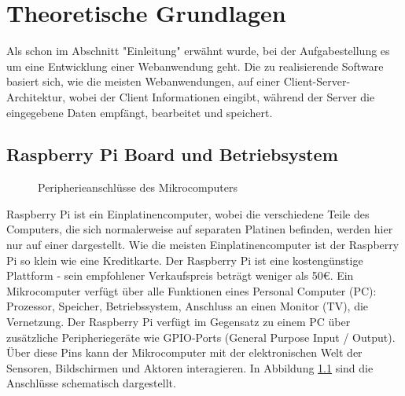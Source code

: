 \chapter{Theoretische Grundlagen}
\label{sec:theorie}
Als schon im Abschnitt "Einleitung" erwähnt wurde, bei der Aufgabestellung es um eine Entwicklung einer Webanwendung geht. Die zu realisierende Software basiert sich, wie die meisten Webanwendungen, auf einer Client-Server-Architektur, wobei der Client Informationen eingibt, während der Server die eingegebene Daten empfängt, bearbeitet und speichert. 

\section{Raspberry Pi Board und Betriebsystem }
\label{sec:theorie:raspberry}
\begin{figure}
	\caption{Peripherieanschlüsse des Mikrocomputers}
	\label{fig:rasp}
\end{figure}
Raspberry Pi ist ein Einplatinencomputer, wobei die verschiedene Teile des Computers, die sich normalerweise auf separaten Platinen befinden, werden hier nur auf einer dargestellt. Wie die meisten Einplatinencomputer ist der Raspberry Pi so klein wie eine Kreditkarte. Der Raspberry Pi ist eine kostengünstige Plattform - sein empfohlener Verkaufspreis beträgt weniger als 50€. Ein Mikrocomputer verfügt über alle Funktionen eines Personal Computer (PC): Prozessor, Speicher, Betriebssystem, Anschluss an einen Monitor (TV), die Vernetzung. Der Raspberry Pi verfügt im Gegensatz zu einem PC über zusätzliche Peripheriegeräte wie GPIO-Ports (General Purpose Input / Output). Über diese Pins kann der Mikrocomputer mit der elektronischen Welt der Sensoren, Bildschirmen und Aktoren interagieren. In Abbildung \ref{fig:rasp}\cite{website:3} sind die Anschlüsse schematisch dargestellt.

